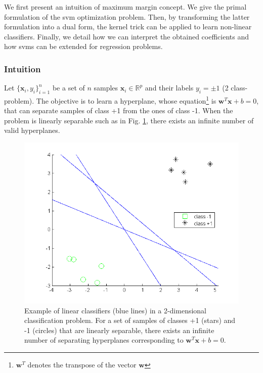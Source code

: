 We first present an intuition of maximum margin concept. We give the primal formulation of the {\sc svm} optimization problem. Then, by transforming the latter formulation into a dual form, the kernel trick can be applied to learn non-linear classifiers. Finally, we detail how we can interpret the obtained coefficients and how {\sc svm}s can be extended for regression problems.



\subsubsection{Intuition}
Let $\{\textbf{x}_i,y_i\}_{i=1}^n$ be a set of $n$ samples $\textbf{x}_i \in \mathbb{R}^p$ and their labels $y_i= \pm 1$ (2 class-problem). The objective is to learn a hyperplane, whose equation\footnote{$\textbf{w}^T$ denotes the transpose of the vector $\textbf{w}$} is $\textbf{w}^T \textbf{x} + b = 0$, that can separate samples of class +1 from the ones of class -1. When the problem is linearly separable such as in Fig. \ref{fig:Plusieurs_separatrice_lineaire}, there exists an infinite number of valid hyperplanes. 

\begin{figure}[h!]
\centering
\includegraphics[width=0.5\linewidth]{images/Plusieurs_separatrice_lineaire2}
\caption[Example of linear classifiers (blue lines) in a 2-dimensional classification problem.]{Example of linear classifiers (blue lines) in a 2-dimensional classification problem. For a set of samples of classes +1 (stars) and -1 (circles) that are linearly separable, there exists an infinite number of separating hyperplanes corresponding to $\textbf{w}^T\textbf{x} + b = 0.$ }
\label{fig:Plusieurs_separatrice_lineaire}
\end{figure}


